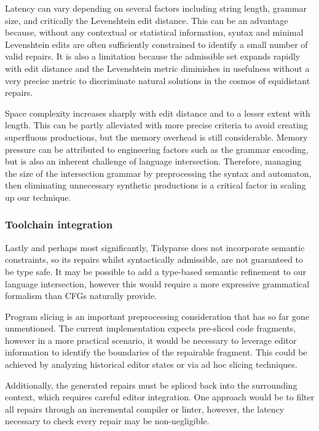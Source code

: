 \documentclass[sigplan,acmsmall,nonacm,screen]{acmart}\settopmatter{printfolios=false,printccs=false,printacmref=false}
\begin{document}
  Latency can vary depending on several factors including string length, grammar size, and critically the Levenshtein edit distance. This can be an advantage because, without any contextual or statistical information, syntax and minimal Levenshtein edits are often sufficiently constrained to identify a small number of valid repairs. It is also a limitation because the admissible set expands rapidly with edit distance and the Levenshtein metric diminishes in usefulness without a very precise metric to discriminate natural solutions in the cosmos of equidistant repairs.

  Space complexity increases sharply with edit distance and to a lesser extent with length. This can be partly alleviated with more precise criteria to avoid creating superfluous productions, but the memory overhead is still considerable. Memory pressure can be attributed to engineering factors such as the grammar encoding, but is also an inherent challenge of language intersection. Therefore, managing the size of the intersection grammar by preprocessing the syntax and automaton, then eliminating unnecessary synthetic productions is a critical factor in scaling up our technique.

  \subsubsection{Toolchain integration}

  Lastly and perhaps most significantly, Tidyparse does not incorporate semantic constraints, so its repairs whilst syntactically admissible, are not guaranteed to be type safe. It may be possible to add a type-based semantic refinement to our language intersection, however this would require a more expressive grammatical formalism than CFGs naturally provide.

  Program slicing is an important preprocessing consideration that has so far gone unmentioned. The current implementation expects pre-sliced code fragments, however in a more practical scenario, it would be necessary to leverage editor information to identify the boundaries of the repairable fragment. This could be achieved by analyzing historical editor states or via ad hoc slicing techniques.

  Additionally, the generated repairs must be spliced back into the surrounding context, which requires careful editor integration. One approach would be to filter all repairs through an incremental compiler or linter, however, the latency necessary to check every repair may be non-negligible.
\end{document}
